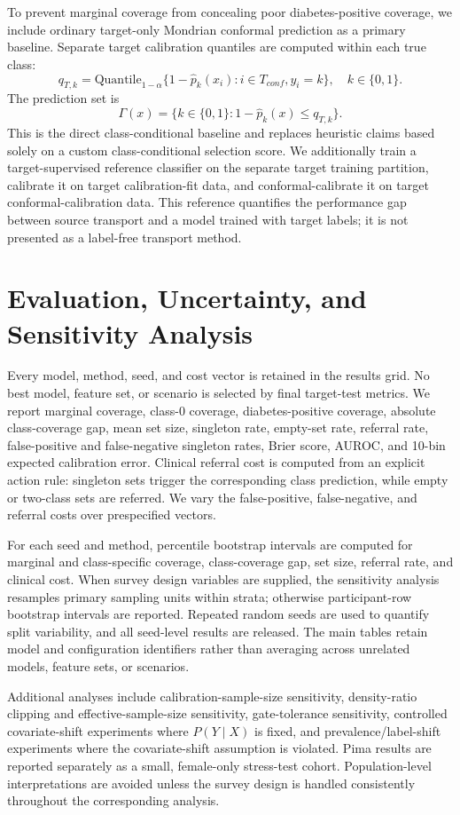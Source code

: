 To prevent marginal coverage from concealing poor diabetes-positive coverage,
we include ordinary target-only Mondrian conformal prediction as a primary
baseline. Separate target calibration quantiles are computed within each true
class:
\begin{equation}
 q_{T,k}=\mathrm{Quantile}_{1-\alpha}
 \{1-\widehat p_k(x_i): i\in T_{conf}, y_i=k\},\quad k\in\{0,1\}.
\end{equation}
The prediction set is
\begin{equation}
 \Gamma(x)=\{k\in\{0,1\}:1-\widehat p_k(x)\le q_{T,k}\}.
\end{equation}
This is the direct class-conditional baseline and replaces heuristic claims
based solely on a custom class-conditional selection score. We additionally
train a target-supervised reference classifier on the separate target training
partition, calibrate it on target calibration-fit data, and conformal-calibrate
it on target conformal-calibration data. This reference quantifies the
performance gap between source transport and a model trained with target labels;
it is not presented as a label-free transport method.

\section{Evaluation, Uncertainty, and Sensitivity Analysis}
\label{sec:evaluation}

Every model, method, seed, and cost vector is retained in the results grid.
No best model, feature set, or scenario is selected by final target-test
metrics. We report marginal coverage, class-0 coverage, diabetes-positive
coverage, absolute class-coverage gap, mean set size, singleton rate, empty-set
rate, referral rate, false-positive and false-negative singleton rates, Brier
score, AUROC, and 10-bin expected calibration error. Clinical referral cost is
computed from an explicit action rule: singleton sets trigger the corresponding
class prediction, while empty or two-class sets are referred. We vary the
false-positive, false-negative, and referral costs over prespecified vectors.

For each seed and method, percentile bootstrap intervals are computed for
marginal and class-specific coverage, class-coverage gap, set size, referral
rate, and clinical cost. When survey design variables are supplied, the
sensitivity analysis resamples primary sampling units within strata; otherwise
participant-row bootstrap intervals are reported. Repeated random seeds are
used to quantify split variability, and all seed-level results are released.
The main tables retain model and configuration identifiers rather than
averaging across unrelated models, feature sets, or scenarios.

Additional analyses include calibration-sample-size sensitivity, density-ratio
clipping and effective-sample-size sensitivity, gate-tolerance sensitivity,
controlled covariate-shift experiments where $P(Y\mid X)$ is fixed, and
prevalence/label-shift experiments where the covariate-shift assumption is
violated. Pima results are reported separately as a small, female-only
stress-test cohort. Population-level interpretations are avoided unless the
survey design is handled consistently throughout the corresponding analysis.
